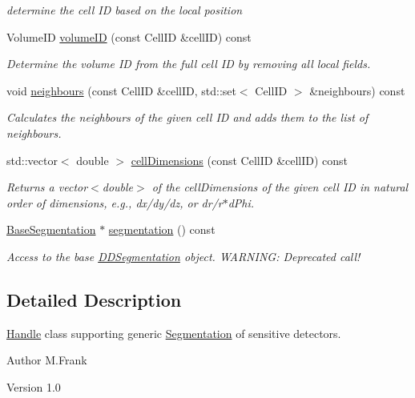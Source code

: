 \begin{DoxyCompactItemize}
\begin{DoxyCompactList}\small\item\em determine the cell ID based on the local position \item\end{DoxyCompactList}\item 
VolumeID \hyperlink{class_d_d4hep_1_1_geometry_1_1_segmentation_a2e3c79064485c1811870d9d6b44b002b}{volumeID} (const CellID \&cellID) const 
\begin{DoxyCompactList}\small\item\em Determine the volume ID from the full cell ID by removing all local fields. \item\end{DoxyCompactList}\item 
void \hyperlink{class_d_d4hep_1_1_geometry_1_1_segmentation_abdda7033305b6df79627598d9d0e67e2}{neighbours} (const CellID \&cellID, std::set$<$ CellID $>$ \&neighbours) const 
\begin{DoxyCompactList}\small\item\em Calculates the neighbours of the given cell ID and adds them to the list of neighbours. \item\end{DoxyCompactList}\item 
std::vector$<$ double $>$ \hyperlink{class_d_d4hep_1_1_geometry_1_1_segmentation_a7512677d05495fef34e7f85f08fc4ad7}{cellDimensions} (const CellID \&cellID) const 
\begin{DoxyCompactList}\small\item\em Returns a vector$<$double$>$ of the cellDimensions of the given cell ID in natural order of dimensions, e.g., dx/dy/dz, or dr/r$\ast$dPhi. \item\end{DoxyCompactList}\item 
\hyperlink{class_d_d4hep_1_1_d_d_segmentation_1_1_segmentation}{BaseSegmentation} $\ast$ \hyperlink{class_d_d4hep_1_1_geometry_1_1_segmentation_a5b1895bb731ecc90cfae04294b097a38}{segmentation} () const 
\begin{DoxyCompactList}\small\item\em Access to the base \hyperlink{namespace_d_d4hep_1_1_d_d_segmentation}{DDSegmentation} object. WARNING: Deprecated call! \item\end{DoxyCompactList}\end{DoxyCompactItemize}


\subsection{Detailed Description}
\hyperlink{class_d_d4hep_1_1_handle}{Handle} class supporting generic \hyperlink{class_d_d4hep_1_1_geometry_1_1_segmentation}{Segmentation} of sensitive detectors. \begin{DoxyAuthor}{Author}
M.Frank 
\end{DoxyAuthor}
\begin{DoxyVersion}{Version}
1.0 
\end{DoxyVersion}


